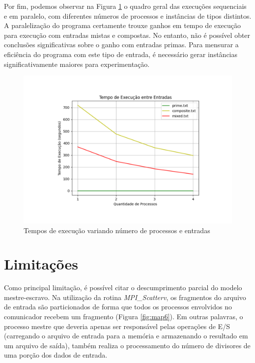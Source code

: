 \documentclass[a4paper, 12pt]{article}
\begin{document}
Por fim, podemos observar na Figura \ref{fig:map5} o quadro geral das execuções sequenciais e em paralelo, com diferentes números de processos e instâncias de tipos distintos. A paralelização do programa certamente trouxe ganhos em tempo de execução para execução com entradas mistas e compostas. No entanto, não é possível obter conclusões significativas sobre o ganho com entradas primas. Para mensurar a eficiência do programa com este tipo de entrada, é necessário gerar instâncias significativamente maiores para experimentação.

\vspace*{-1.3cm}
\begin{figure}[H]
    \centering
    \includegraphics[width=1.1\textwidth]{Images/parallel.pdf}
    \vspace*{-1.5cm}
    \caption{Tempos de execução variando número de processos e entradas}
    \label{fig:map5}
\end{figure}

\section{Limitações}

Como principal limitação, é possível citar o descumprimento parcial do modelo mestre-escravo. Na utilização da rotina \emph{MPI\_Scatterv}, os fragmentos do arquivo de entrada são particionados de forma que todos os processos envolvidos no comunicador recebem um fragmento (Figura \ref{fig:map6}). Em outras palavras, o processo mestre que deveria apenas ser responsável pelas operações de E/S (carregando o arquivo de entrada para a memória e armazenando o resultado em um arquivo de saída), também realiza o processamento do número de divisores de uma porção dos dados de entrada.
\end{document}
